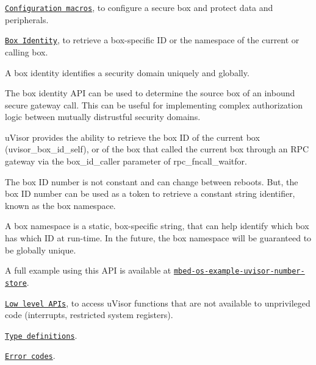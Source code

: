 \begin{DoxyEnumerate}
\item \href{#configuration-macros}{\tt Configuration macros}, to configure a secure box and protect data and peripherals.
\item \href{#box-identity}{\tt Box Identity}, to retrieve a box-\/specific ID or the namespace of the current or calling box.
\begin{DoxyItemize}
\item A box identity identifies a security domain uniquely and globally.
\item The box identity A\+PI can be used to determine the source box of an inbound secure gateway call. This can be useful for implementing complex authorization logic between mutually distrustful security domains.
\item u\+Visor provides the ability to retrieve the box ID of the current box ({\ttfamily uvisor\+\_\+box\+\_\+id\+\_\+self}), or of the box that called the current box through an R\+PC gateway via the {\ttfamily box\+\_\+id\+\_\+caller} parameter of {\ttfamily rpc\+\_\+fncall\+\_\+waitfor}.
\item The box ID number is not constant and can change between reboots. But, the box ID number can be used as a token to retrieve a constant string identifier, known as the box namespace.
\item A box namespace is a static, box-\/specific string, that can help identify which box has which ID at run-\/time. In the future, the box namespace will be guaranteed to be globally unique.
\item A full example using this A\+PI is available at \href{https://github.com/ARMmbed/mbed-os-example-uvisor-number-store}{\tt mbed-\/os-\/example-\/uvisor-\/number-\/store}.
\end{DoxyItemize}
\item \href{#low-level-apis}{\tt Low level A\+P\+Is}, to access u\+Visor functions that are not available to unprivileged code (interrupts, restricted system registers).
\item \href{#type-definitions}{\tt Type definitions}.
\item \href{#error-codes}{\tt Error codes}.
\end{DoxyEnumerate}

